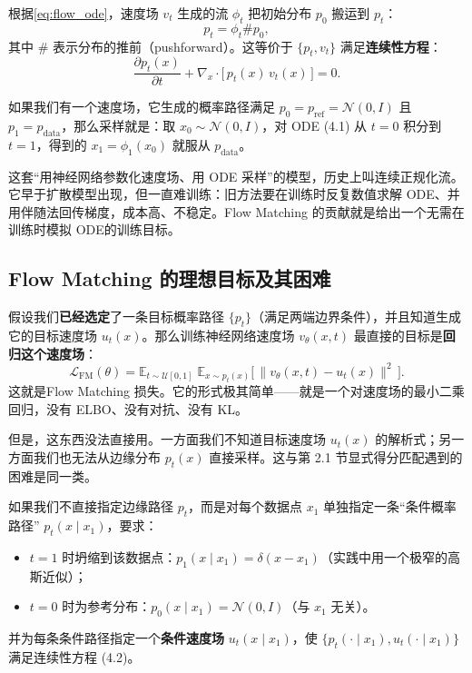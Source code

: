根据\eqref{eq:flow_ode}，速度场 $v_t$ 生成的流 $\phi_t$ 把初始分布 $p_0$ 搬运到 $p_t$：
\begin{equation}
p_t = \phi_t\# p_0,
\end{equation}
其中 $\#$ 表示分布的推前（pushforward）。这等价于 $\{p_t, v_t\}$ 满足\textbf{连续性方程}：
\begin{equation}\label{eq:continuity_equation_flow_matching}
\frac{\partial p_t(x)}{\partial t} + \nabla_x\cdot\big[\,p_t(x)\,v_t(x)\,\big] = 0.
\end{equation}

如果我们有一个速度场，它生成的概率路径满足 $p_0=p_{\text{ref}}=\mathcal N(0,I)$ 且 $p_1=p_{\text{data}}$，那么采样就是：取 $x_0\sim\mathcal N(0,I)$，对 ODE (4.1) 从 $t=0$ 积分到 $t=1$，得到的 $x_1=\phi_1(x_0)$ 就服从 $p_{\text{data}}$。

这套“用神经网络参数化速度场、用 ODE 采样”的模型，历史上叫连续正规化流。它早于扩散模型出现，但一直难训练：旧方法要在训练时反复数值求解 ODE、并用伴随法回传梯度，成本高、不稳定。Flow Matching 的贡献就是给出一个无需在训练时模拟 ODE的训练目标。

\subsection{Flow Matching 的理想目标及其困难}

假设我们\textbf{已经选定}了一条目标概率路径 $\{p_t\}$（满足两端边界条件），并且知道生成它的目标速度场 $u_t(x)$。那么训练神经网络速度场 $v_\theta(x,t)$ 最直接的目标是\textbf{回归这个速度场}：
\begin{equation}\label{eq:flow_matching_loss}
\mathcal L_{\text{FM}}(\theta) = \mathbb{E}_{t\sim\mathcal U[0,1]}\;\mathbb{E}_{x\sim p_t(x)}
\Big[\,\big\| v_\theta(x,t) - u_t(x) \big\|^2\,\Big].
\end{equation}
这就是Flow Matching 损失。它的形式极其简单——就是一个对速度场的最小二乘回归，没有 ELBO、没有对抗、没有 KL。

但是，这东西没法直接用。一方面我们不知道目标速度场 $u_t(x)$ 的解析式；另一方面我们也无法从边缘分布 $p_t(x)$ 直接采样。这与第 2.1 节显式得分匹配遇到的困难是同一类。

如果我们不直接指定边缘路径 $p_t$，而是对每个数据点 $x_1$ 单独指定一条“条件概率路径” $p_t(x\mid x_1)$，要求：
\begin{itemize}
\item $t=1$ 时坍缩到该数据点：$p_1(x\mid x_1) = \delta(x-x_1)$（实践中用一个极窄的高斯近似）；
\item $t=0$ 时为参考分布：$p_0(x\mid x_1) = \mathcal N(0, I)$（与 $x_1$ 无关）。
\end{itemize}
并为每条条件路径指定一个\textbf{条件速度场} $u_t(x\mid x_1)$，使 $\{p_t(\cdot\mid x_1), u_t(\cdot\mid x_1)\}$ 满足连续性方程 (4.2)。

